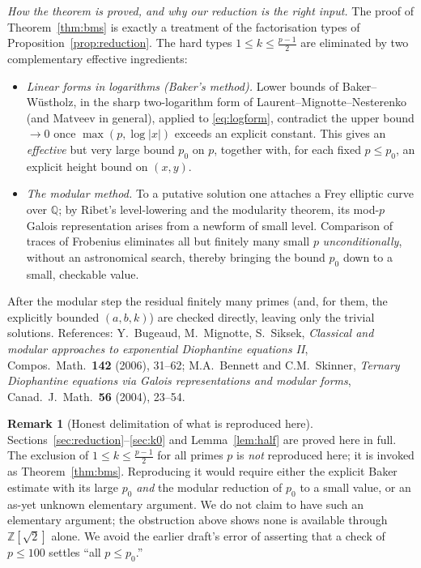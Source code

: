 \documentclass{amsart}
\theoremstyle{definition}
\newtheorem{remark}{Remark}
\begin{document}
\noindent\emph{How the theorem is proved, and why our reduction is the right
input.} The proof of Theorem~\ref{thm:bms} is exactly a treatment of the
factorisation types of Proposition~\ref{prop:reduction}. The hard types
$1\le k\le\frac{p-1}{2}$ are eliminated by two complementary effective
ingredients:
\begin{itemize}
\item \emph{Linear forms in logarithms (Baker's method).} Lower bounds of
Baker--W\"ustholz, in the sharp two-logarithm form of Laurent--Mignotte--Nesterenko
(and Matveev in general), applied to \eqref{eq:logform}, contradict the upper
bound $\to0$ once $\max(p,\log|x|)$ exceeds an explicit constant. This gives an
\emph{effective} but very large bound $p_0$ on $p$, together with, for each
fixed $p\le p_0$, an explicit height bound on $(x,y)$.
\item \emph{The modular method.} To a putative solution one attaches a Frey
elliptic curve over $\mathbb Q$; by Ribet's level-lowering and the modularity
theorem, its mod-$p$ Galois representation arises from a newform of small
level. Comparison of traces of Frobenius eliminates all but finitely many
small $p$ \emph{unconditionally}, without an astronomical search, thereby
bringing the bound $p_0$ down to a small, checkable value.
\end{itemize}
After the modular step the residual finitely many primes (and, for them, the
explicitly bounded $(a,b,k)$) are checked directly, leaving only the trivial
solutions. References: Y.~Bugeaud, M.~Mignotte, S.~Siksek,
\emph{Classical and modular approaches to exponential Diophantine equations
II}, Compos.\ Math.\ \textbf{142} (2006), 31--62; M.A.~Bennett and
C.M.~Skinner, \emph{Ternary Diophantine equations via Galois representations
and modular forms}, Canad.\ J.\ Math.\ \textbf{56} (2004), 23--54.

\begin{remark}[Honest delimitation of what is reproduced here]
Sections~\ref{sec:reduction}--\ref{sec:k0} and Lemma~\ref{lem:half} are
proved here in full. The exclusion of $1\le k\le\frac{p-1}{2}$ for all primes
$p$ is \emph{not} reproduced here; it is invoked as Theorem~\ref{thm:bms}.
Reproducing it would require either the explicit Baker estimate with its large
$p_0$ \emph{and} the modular reduction of $p_0$ to a small value, or an as-yet
unknown elementary argument. We do not claim to have such an elementary
argument; the obstruction above shows none is available through
$\mathbb Z[\sqrt2]$ alone. We avoid the earlier draft's error of asserting
that a check of $p\le100$ settles ``all $p\le p_0$.''
\end{remark}
\end{document}
